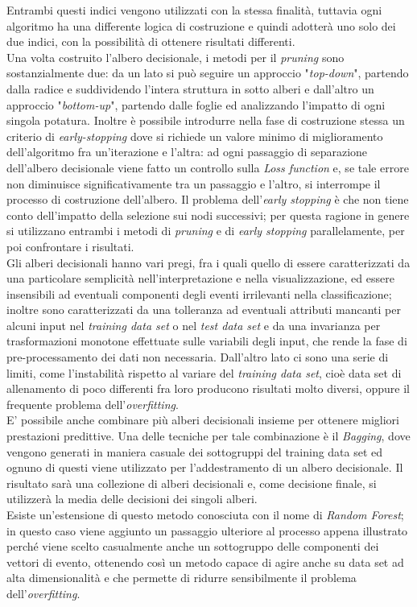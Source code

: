 Entrambi questi indici vengono utilizzati con la stessa finalità, tuttavia ogni algoritmo ha una differente logica di costruzione e quindi adotterà uno solo dei due indici, con la possibilità di ottenere risultati differenti. \\
Una volta costruito l'albero decisionale, i metodi per il \textit{pruning} sono sostanzialmente due: da un lato si può seguire un approccio "\textit{top-down}", partendo dalla radice e suddividendo l'intera struttura in sotto alberi e dall'altro un approccio "\textit{bottom-up}", partendo dalle foglie ed analizzando l'impatto di ogni singola potatura. Inoltre è possibile introdurre nella fase di costruzione stessa un criterio di \textit{early-stopping} dove si richiede un valore minimo di miglioramento dell'algoritmo fra un'iterazione e l'altra: ad ogni passaggio di separazione dell'albero decisionale viene fatto un controllo sulla \textit{Loss function} e, se tale errore non diminuisce significativamente tra un passaggio e l'altro, si interrompe il processo di costruzione dell'albero. Il problema dell'\textit{early stopping} è che non tiene conto dell'impatto della selezione sui nodi successivi; per questa ragione in genere si utilizzano entrambi i metodi di \textit{pruning} e di \textit{early stopping} parallelamente, per poi confrontare i risultati. \\
Gli alberi decisionali hanno vari pregi, fra i quali quello di essere caratterizzati da una particolare semplicità nell'interpretazione e nella visualizzazione, ed essere insensibili ad eventuali componenti degli eventi irrilevanti nella classificazione; inoltre sono caratterizzati da una tolleranza ad eventuali attributi mancanti per alcuni input nel \textit{training data set} o nel \textit{test data set} e da una invarianza per trasformazioni monotone effettuate sulle variabili degli input, che rende la fase di pre-processamento dei dati non necessaria. Dall'altro lato ci sono una serie di limiti, come l'instabilità rispetto al variare del \textit{training data set}, cioè data set di allenamento di poco differenti fra loro producono risultati molto diversi, oppure il frequente problema dell'\textit{overfitting}. \\
E' possibile anche combinare più alberi decisionali insieme per ottenere migliori prestazioni predittive. Una delle tecniche per tale combinazione è il \textit{Bagging}, dove vengono generati in maniera casuale dei sottogruppi del training data set ed ognuno di questi viene utilizzato per l'addestramento di un albero decisionale. Il risultato sarà una collezione di alberi decisionali e, come decisione finale, si utilizzerà la media delle decisioni dei singoli alberi. \\
Esiste un'estensione di questo metodo conosciuta con il nome di \textit{Random Forest}; in questo caso viene aggiunto un passaggio ulteriore al processo appena illustrato perché viene scelto casualmente anche un sottogruppo delle componenti dei vettori di evento, ottenendo così un metodo capace di agire anche su data set ad alta dimensionalità e che permette di ridurre sensibilmente il problema dell'\textit{overfitting}.

